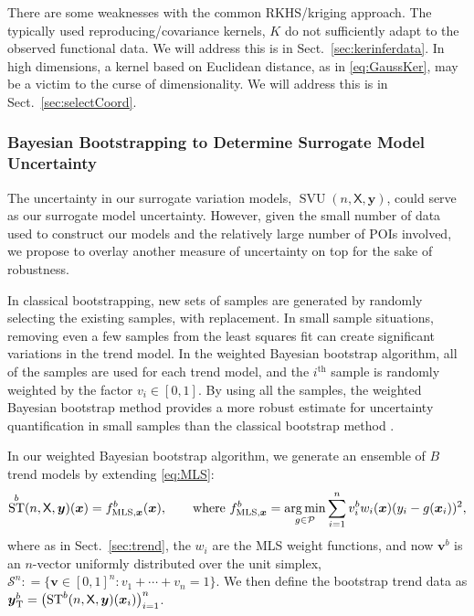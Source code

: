 \documentclass[11pt]{NSFamsart}
\DeclareMathOperator*{\argmin}{arg\,min}
\DeclareMathOperator{\STREND}{ST} %
\DeclareMathOperator{\SVARERR}{SVU} %
\newcommand{\TREND}{\textup{T}}
\newcommand{\LS}{\textup{MLS}}
\newcommand{\mX}{\mathsf{X}}
\newcommand{\bx}{{\boldsymbol{x}}}
\newcommand{\bv}{{\boldsymbol{v}}}
\newcommand{\by}{{\boldsymbol{y}}}
\newcommand{\calp}{{\mathcal{P}}}
\newcommand{\cals}{{\mathcal{S}}}
\begin{document}
There are some weaknesses with the common RKHS/kriging approach. The typically used reproducing/covariance kernels, $K$ do not sufficiently adapt to the observed functional data. We will address this is in Sect.\ \ref{sec:kerinferdata}. In high dimensions, a kernel based on Euclidean distance, as in \eqref{eq:GaussKer}, may be a victim to the curse of dimensionality. We will address this is in Sect.\ \ref{sec:selectCoord}.


\subsubsection{Bayesian Bootstrapping to Determine Surrogate Model Uncertainty} \label{sec:BayesianBootUncertainty}
The uncertainty in our surrogate variation models, $\SVARERR(n,\mX,\by)$, could serve as our surrogate model uncertainty. However, given the small number of data used to construct our models and the relatively large number of POIs involved, we propose to overlay another measure of uncertainty on top for the sake of robustness. 

In classical bootstrapping, new sets of samples are generated by randomly selecting the existing samples, with replacement. 
In small sample situations, removing even a few samples from the least squares fit can create significant variations in the trend model. In the weighted Bayesian bootstrap algorithm, all of the samples are used for each trend model, and the $i^{\text{th}}$ sample is randomly weighted by the factor $v_i \in [0,1]$. By using all the samples, the weighted Bayesian bootstrap method provides a more robust estimate for uncertainty quantification in small samples than the classical bootstrap method \cite{rubin1981bayesian, efron1986bootstrap, efron2016computer}. 

In our weighted Bayesian bootstrap algorithm, we generate an ensemble of $B$ trend models by extending \eqref{eq:MLS}:
\begin{equation}
\STREND^b(n,\mX,\by)(\bx) = f^b_{\LS,\bx}(\bx), \qquad \text{where } f^b_{\LS,\bx} = \argmin_{g \in \calp} \sum_{i=1}^n v_i^b w_i(\bx)(y_i - g(\bx_i))^2,
\end{equation}
where as in Sect.\ \ref{sec:trend}, the $w_i$ are the MLS weight functions, and now $\bv^b$ is an $n$-vector uniformly distributed over the unit simplex, $\cals^n : = \{\bv \in [0,1]^n : v_1 + \cdots + v_n = 1\}$. We then define the bootstrap trend data as $\by^b_{\TREND} = \bigl(\STREND^b(n,\mX,\by)(\bx_i) \bigr)_{i=1}^n$. 
\end{document}
